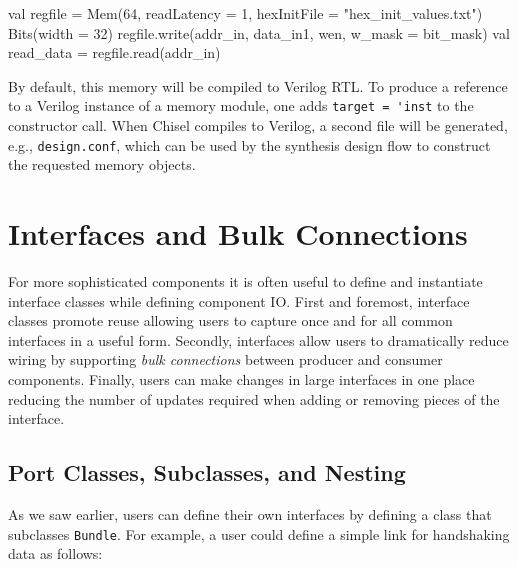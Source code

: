 \documentclass[twocolumn,10pt]{article}
\begin{document}
\begin{scala}
  val regfile =
    Mem(64, readLatency = 1, 
        hexInitFile = "hex_init_values.txt"){ Bits(width = 32) }
  regfile.write(addr_in, data_in1, wen, w_mask = bit_mask)
  val read_data = regfile.read(addr_in)
\end{scala}


% 
% 
By default, this memory will be compiled to Verilog RTL.  To produce a
reference to a Verilog instance of a memory module, one adds
\verb+target = 'inst+ to the constructor call.  When Chisel compiles
to Verilog, a second file will be generated, e.g., \verb+design.conf+,
which can be used by the synthesis design flow to construct the
requested memory objects.

\section{Interfaces and Bulk Connections}
\label{sec:interfaces}

For more sophisticated components it is often useful to define and
instantiate interface classes while defining component IO.  First and
foremost, interface classes promote reuse allowing users to capture
once and for all common interfaces in a useful form.  Secondly,
interfaces allow users to dramatically reduce wiring by supporting
{\em bulk connections} between producer and consumer components.  Finally,
users can make changes in large interfaces in one place reducing the
number of updates required when adding or removing pieces of the
interface.

\subsection{Port Classes, Subclasses, and Nesting}

As we saw earlier, users can define their own interfaces by defining a class that subclasses \verb+Bundle+.  
For example, a user could define a simple link for handshaking data as follows:
\end{document}
